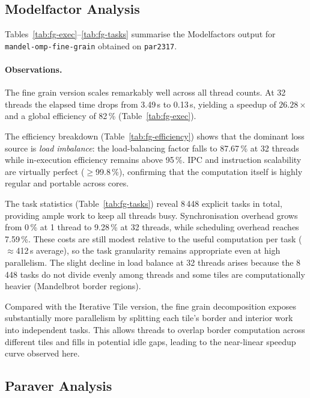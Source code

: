 \subsection{Modelfactor Analysis}
\label{sec:iter-fine-mf}

Tables~\ref{tab:fg-exec}--\ref{tab:fg-tasks} summarise the Modelfactors output for
\texttt{mandel-omp-fine-grain} obtained on \texttt{par2317}.







\paragraph{Observations.}
The fine grain version scales remarkably well across all thread counts.
At 32 threads the elapsed time drops from 3.49\,s to 0.13\,s, yielding a
speedup of $26.28\times$ and a global efficiency of 82\,\% (Table~\ref{tab:fg-exec}).

The efficiency breakdown (Table~\ref{tab:fg-efficiency}) shows that the dominant loss
source is \emph{load imbalance}: the load-balancing factor falls to 87.67\,\% at 32
threads while in-execution efficiency remains above 95\,\%.
IPC and instruction scalability are virtually perfect ($\geq$99.8\,\%), confirming that
the computation itself is highly regular and portable across cores.

The task statistics (Table~\ref{tab:fg-tasks}) reveal 8\,448 explicit tasks in total,
providing ample work to keep all threads busy.
Synchronisation overhead grows from 0\,\% at 1 thread to 9.28\,\% at 32 threads,
while scheduling overhead reaches 7.59\,\%.
These costs are still modest relative to the useful computation per task
(\(\approx\)412\,\textmu s average), so the task granularity remains appropriate even at
high parallelism.
The slight decline in load balance at 32 threads arises because the 8\,448 tasks do not
divide evenly among threads and some tiles are computationally heavier (Mandelbrot
border regions).

Compared with the Iterative Tile version, the fine grain decomposition exposes
substantially more parallelism by splitting each tile's border and interior work into
independent tasks.
This allows threads to overlap border computation across different tiles and fills
in potential idle gaps, leading to the near-linear speedup curve observed here.

\subsection{Paraver Analysis}
\label{sec:iter-fine-paraver}

